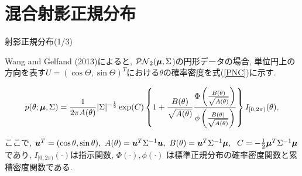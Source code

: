 \documentclass[dvipdfmx]{beamer} %
\newcommand{\bm}[1]{\mbox{\boldmath $#1$}}
\begin{document}
\section{混合射影正規分布}
\begin{frame}{射影正規分布(1/3)}

Wang and Gelfand (2013)によると, $\mathcal{PN}_2(\bm \mu,\Sigma$)の円形データの場合, 単位円上の方向を表す$U = (\cos\Theta, \sin\Theta)^T$における$\theta$の確率密度を式(\ref{PNC})に示す.

\vspace{-0.5cm}
\footnotesize
\begin{eqnarray}
\label{PNC}
p(\theta; \bm \mu, \Sigma) = \frac{1}{2\pi A(\theta)}|\Sigma|^{-\frac{1}{2}}
\exp(C)\left\{1 + \frac{B(\theta)}{\sqrt{A(\theta)}} \frac{\Phi \left(\frac{B(\theta)}{\sqrt{A(\theta)}}\right)}{\phi \left(\frac{B(\theta)}{\sqrt{A(\theta)}}\right)}\right\} I_{[0,2\pi)}(\theta),
\end{eqnarray}
\normalsize

ここで, $\bm u^T = (\cos\theta,\sin\theta), \ A(\theta) = \bm u^T\Sigma^{-1}\bm u, \ B(\theta) = \bm u^T \Sigma^{-1} \bm \mu,$
$\ C = -\frac{1}{2} \bm \mu^T \Sigma^{-1} \bm \mu$であり, $I_{[0,2\pi)} (\cdot)$は指示関数, $\Phi(\cdot), \phi(\cdot)$ は標準正規分布の確率密度関数と累積密度関数である.

\end{frame}
\end{document}
